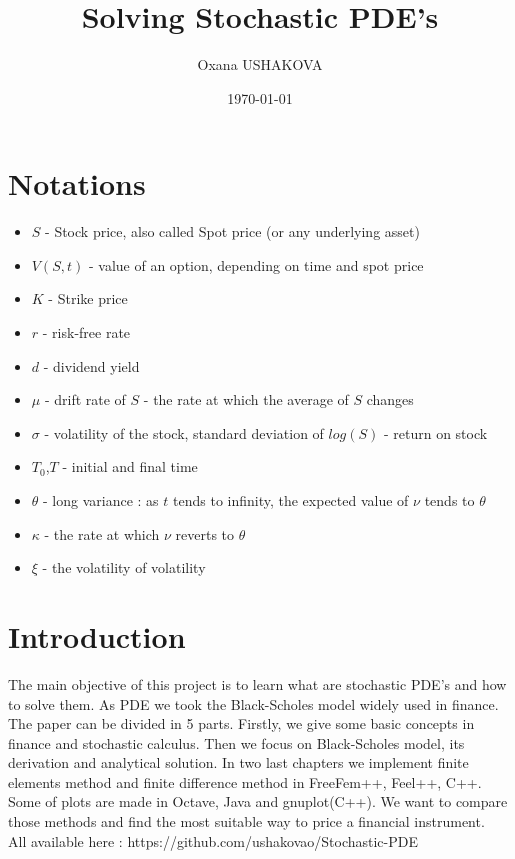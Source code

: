 \documentclass[a4paper]{report}
\title{ Solving Stochastic PDE's   }
\author{Oxana USHAKOVA}
\date {\today}
\begin{document}
\maketitle
\tableofcontents
\newpage
\section*{Notations}
\begin{itemize}
\item $S$ - Stock price, also called Spot price (or any underlying asset)
\item $V(S,t)$ - value of an option, depending on time and spot price
\item $K$ - Strike price
\item $r$ - risk-free rate
\item $d$ - dividend yield
\item $\mu$ - drift rate of $S$ - the rate at which the average of $S$ changes
\item $\sigma$ - volatility of the stock, standard deviation of $log(S)$ - return on stock
\item $T_0$,$T$ - initial and final time
\item $\theta$ - long variance : as $t$ tends to infinity, the expected value of $\nu$ tends to $\theta$ 
\item $\kappa$ - the rate at which $\nu$ reverts to $\theta$
\item $\xi$ - the volatility of volatility
\end{itemize}



\newpage
\section*{Introduction}


The main objective of this project is to learn what are stochastic PDE's and how to solve them. As PDE we took the Black-Scholes model widely used in finance. 
\newline
The paper can be divided in 5 parts. Firstly, we give some basic concepts in finance and stochastic calculus. Then we focus on Black-Scholes model, its derivation and analytical solution. In two last chapters we implement finite elements method and finite difference method in FreeFem++, Feel++, C++. Some of plots are made in Octave, Java and gnuplot(C++). We want to compare those methods and find the most suitable way to price a financial instrument.\\
\newline
All available here : https://github.com/ushakovao/Stochastic-PDE
\end{document}
